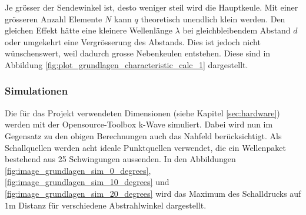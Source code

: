 Je grösser der Sendewinkel ist, desto weniger steil wird die Hauptkeule. Mit einer grösseren Anzahl Elemente $N$ kann $q$ theoretisch unendlich klein werden. Den gleichen Effekt hätte eine kleinere Wellenlänge $\lambda$ bei gleichbleibendem Abstand $d$ oder umgekehrt eine Vergrösserung des Abstands. Dies ist jedoch nicht wünschenswert, weil dadurch grosse Nebenkeulen entstehen. Diese sind in Abbildung \ref{fig:plot_grundlagen_characteristic_calc_1} dargestellt.


\clearpage
\subsubsection{Simulationen}\label{sec:simulationen}
Die für das Projekt verwendeten Dimensionen (siehe Kapitel \ref{sec:hardware}) werden mit der Opensource-Toolbox k-Wave simuliert. Dabei wird nun im Gegensatz zu den obigen Berechnungen auch das Nahfeld berücksichtigt. Als Schallquellen werden acht ideale Punktquellen verwendet, die ein Wellenpaket bestehend aus 25 Schwingungen aussenden. In den Abbildungen \ref{fig:image_grundlagen_sim_0_degrees}, \ref{fig:image_grundlagen_sim_10_degrees} und \ref{fig:image_grundlagen_sim_20_degrees} wird das Maximum des Schalldrucks auf $1 \mathrm{m}$ Distanz für verschiedene Abstrahlwinkel dargestellt.

